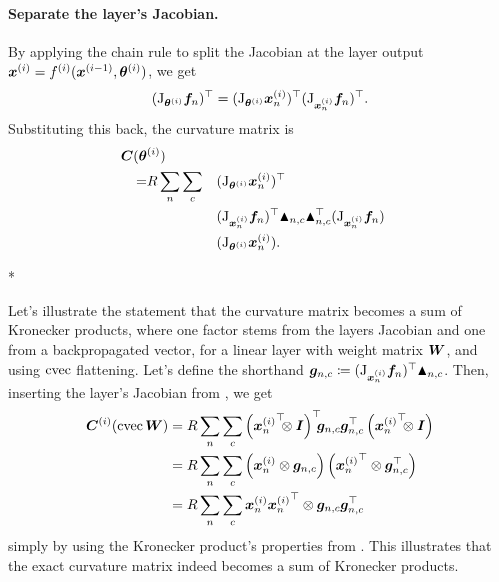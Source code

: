 \paragraph{Separate the layer's Jacobian.}
By applying the chain rule to split the Jacobian at the layer output ${\bm{x}}^{(i)} = f^{(i)}({\bm{x}}^{(i-1)}, {\bm{\theta}}^{(i)})$, we get
\begin{align*}
  (\mathrm{J}_{{\bm{\theta}}^{(i)}} {\bm{f}}_n)^{\top}
  =
  (\mathrm{J}_{{\bm{\theta}}^{(i)}} {\bm{x}}^{(i)}_n)^{\top}
  (\mathrm{J}_{{\bm{x}}_n^{(i)}} {\bm{f}}_n)^{\top}.
\end{align*}
Substituting this back, the curvature matrix is
\begin{align*}
  {\bm{C}}({\bm{\theta}}&^{(i)}) \\ =& R \sum_n \sum_{c}
                          &&(\mathrm{J}_{{\bm{\theta}}^{(i)}} {\bm{x}}^{(i)}_n)^{\top} \\
             & &&(\mathrm{J}_{{\bm{x}}_n^{(i)}} {\bm{f}}_n)^{\top}
                  \blacktriangle_{n,c}
                  \blacktriangle_{n,c}^{\top}
                  (\mathrm{J}_{{\bm{x}}_n^{(i)}} {\bm{f}}_n) \\
             & &&(\mathrm{J}_{{\bm{\theta}}^{(i)}} {\bm{x}}^{(i)}_n).
\end{align*}

\switchcolumn[1]*
\begin{example}\label{ex:curvature-matrix-sum-of-kronecker-products}
  Let's illustrate the statement that the curvature matrix becomes a sum of Kronecker products, where one factor stems from the layers Jacobian and one from a backpropagated vector, for a linear layer with weight matrix ${\bm{W}}$, and using $\operatorname{cvec}$ flattening.
  Let's define the shorthand ${\bm{g}}_{n,c} \coloneqq (\mathrm{J}_{{\bm{x}}_n^{(i)}} {\bm{f}}_n)^{\top} \blacktriangle_{n,c}$.
  Then, inserting the layer's Jacobian from , we get
  \begin{align*}
      \mC^{(i)}(\cvec \mW)
      &= 
      R \sum_n \sum_c
      \left(
      {\vx_n^{(i)}}^{\top}\!\!\! \otimes \mI
      \right)^\top
      \!\!\!\vg_{n,c}
      \vg_{n,c}^\top
      \left(
      {\vx_n^{(i)}}^{\top} \!\!\!\otimes \mI
      \right)
      \\
      &=
      R \sum_n \sum_c
      \left(
      \vx_n^{(i)} \otimes \vg_{n,c}
      \right)
      \left(
      {\vx_n^{(i)}}^\top \otimes \vg_{n,c}^\top
      \right)
      \\
      &=
      R \sum_n \sum_c
      \vx_n^{(i)} {\vx_n^{(i)}}^\top
      \otimes
      \vg_{n,c} \vg_{n,c}^\top\,
  \end{align*}
  simply by using the Kronecker product's properties from .
  This illustrates that the exact curvature matrix indeed becomes a sum of Kronecker products.
\end{example}
\switchcolumn[0]

